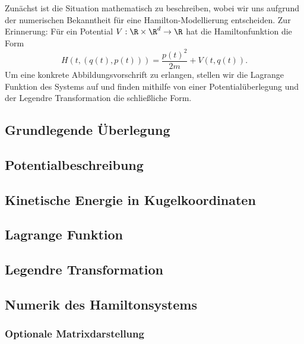 \documentclass{subfiles}
\begin{document}
    Zunächst ist die Situation mathematisch zu beschreiben, wobei wir uns aufgrund der numerischen Bekanntheit für eine Hamilton-Modellierung entscheiden. Zur Erinnerung: Für ein Potential $V:\R\times\R^d\to\R$ hat die Hamiltonfunktion die Form 
    \[
        H(t,(q(t),p(t))) = \frac{p(t)^2}{2m} + V(t,q(t)).
    \]
    Um eine konkrete Abbildungsvorschrift zu erlangen, stellen wir die Lagrange Funktion des Systems auf und finden mithilfe von einer Potentialüberlegung und der Legendre Transformation die schließliche Form. 

    \subsection*{Grundlegende Überlegung}
        
        
    \subsection*{Potentialbeschreibung}
        

    \subsection*{Kinetische Energie in Kugelkoordinaten}
        

    \subsection*{Lagrange Funktion}
        

    \subsection*{Legendre Transformation}
        

    \subsection*{Numerik des Hamiltonsystems}
        
    
    \subsubsection*{Optionale Matrixdarstellung}
        
\end{document}
